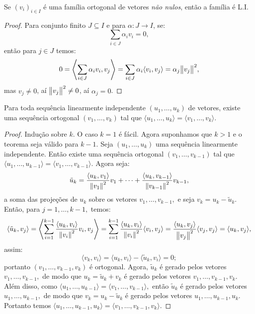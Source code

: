 \documentclass[11pt,twoside,a4paper]{book}
\begin{document}
\begin{proposicao}
Se $(v_i)_{i\in I}$ é uma família ortogonal de vetores \emph{não nulos}, então a família é L.I.
\end{proposicao}
\begin{proof}
Para conjunto finito $J\subseteq I$ e para $\alpha:J\rightarrow I$, se:
\[
\sum_{i\in J}\alpha_iv_i=0,
\]
então para $j\in J$ temos:
\[
0=\left\langle\sum_{i\in J}\alpha_iv_i,v_j\right\rangle=\sum_{i\in J}\alpha_i\langle v_i,v_j\rangle=\alpha_j\norm{v_j}^2,
\]
mas $v_j\neq 0$, aí $\norm{v_j}^2\neq 0$, aí $\alpha_j=0$.
\end{proof}

\begin{teorema}
Para toda sequência linearmente independente $(u_1,\dots,u_k)$ de vetores, existe uma sequência ortogonal $(v_1,\dots,v_k)$ tal que $\langle u_1,\dots,u_k\rangle=\langle v_1,\dots,v_k\rangle$.
\end{teorema}
\begin{proof}
Indução sobre $k$. O caso $k=1$ é fácil. Agora suponhamos que $k>1$ e o teorema seja válido para $k-1.$ Seja $(u_1,\dots,u_k)$ uma sequência linearmente independente. Então existe uma sequência ortogonal $(v_1,\dots,v_{k-1})$ tal que $\langle u_1,\dots,u_{k-1}\rangle=\langle v_1,\dots,v_{k-1}\rangle.$ Agora seja:
\[
\tilde{u}_k=\frac{\langle u_k,v_1\rangle}{\norm{v_1}^2}v_1+\dots+\frac{\langle u_k,v_{k-1}\rangle}{\norm{v_{k-1}}^2}v_{k-1},
\]
a soma das projeções de $u_k$ sobre os vetores $v_1,\dots,v_{k-1},$ e seja $v_k=u_k-\tilde{u}_k.$ Então, para $j=1,\dots,k-1,$ temos:
\[
\langle\tilde{u}_k,v_j\rangle=\left\langle\sum_{i=1}^{k-1}\frac{\langle u_k,v_i\rangle}{\norm{v_i}^2}v_i,v_j\right\rangle=\sum_{i=1}^{k-1}\frac{\langle u_k,v_i\rangle}{\norm{v_i}^2}\langle v_i,v_j\rangle=\frac{\langle u_k,v_j\rangle}{\norm{v_j}^2}\langle v_j,v_j\rangle=\langle u_k,v_j\rangle,
\]
assim:
\[
\langle v_k,v_i\rangle=\langle u_k,v_i\rangle-\langle \tilde{u}_k,v_i\rangle=0;
\]
portanto $(v_1,\dots,v_{k-1},v_k)$ é ortogonal. Agora, $\tilde{u}_k$ é gerado pelos vetores $v_1,\dots,v_{k-1},$ de modo que $u_k=\tilde{u}_k+v_k$ é gerado pelos vetores $v_1,\dots,v_{k-1},v_k.$ Além disso, como $\langle u_1,\dots,u_{k-1}\rangle=\langle v_1,\dots,v_{k-1}\rangle,$ então $\tilde{u}_k$ é gerado pelos vetores $u_1,\dots,u_{k-1},$ de modo que $v_k=u_k-\tilde{u}_k$ é gerado pelos vetores $u_1,\dots,u_{k-1},u_k.$ Portanto temos $\langle u_1,\dots,u_{k-1},u_k\rangle=\langle v_1,\dots,v_{k-1},v_k\rangle.$ 
\end{proof}
\end{document}
